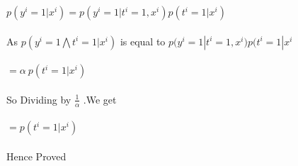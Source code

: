 \newcommand\tab[1][1cm]{\hspace*{#1}}
\begin{answer}
\\ \\
	\tab[2.25cm]$p(y^i =1 | x^i) = p(y^i = 1 | t^i = 1 ,x^i) p(t^i = 1 |x^i)$ \\ \\
	As $p(y^i = 1 \bigwedge  t^i = 1 | x^i) $ is equal to $p(y^i = 1 | t^i = 1 ,x^i) p(t^i = 1 |x^i$ \\ \\ 
	\tab[4.0cm]$=\alpha \ p(t^i = 1 |x^i)$ \\ \\ 
	So Dividing by $\frac{1}{\alpha}$ .We get \\ \\ 
	 \tab[4.0cm]$= p(t^i = 1 |x^i)$ \\ \\ 
	 Hence Proved \\ \\ \\
\end{answer}
